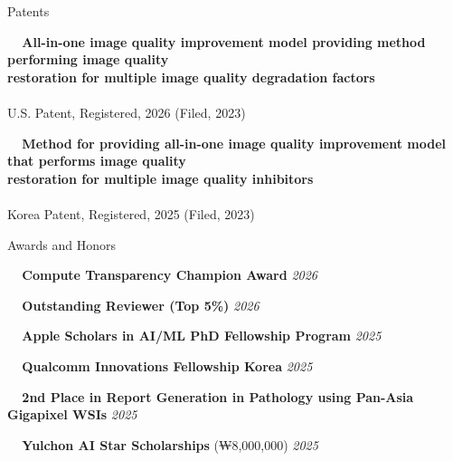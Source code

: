 \documentclass{resume} %
\begin{document}
\begin{rSection}{Patents}

\textbullet~\,\, \textbf{All-in-one image quality improvement model providing method performing image quality \\\hspace*{1.4em}restoration for multiple image quality degradation factors}
\\ 
\\ \hspace*{1.5em}U.S. Patent, Registered, 2026 (Filed, 2023)


\textbullet~\,\, \textbf{Method for providing all-in-one image quality improvement model that performs image quality \\\hspace*{1.4em}restoration for multiple image quality inhibitors}
\\ 
\\ \hspace*{1.5em}Korea Patent, Registered, 2025 (Filed, 2023) \\
\end{rSection}






\begin{rSection}{Awards and Honors}

\textbullet~\,\, {\bf Compute Transparency Champion Award} \hfill {\it 2026}
\\ \hspace*{1.5em}{CVPR 2026 (for ``Erasing Thousands of Concepts'')}

\textbullet~\,\, {\bf Outstanding Reviewer (Top 5\%)} \hfill {\it 2026}
\\ \hspace*{1.5em}{Conference on Computer Vision and Pattern Recognition (CVPR)}

\textbullet~\,\, {\bf Apple Scholars in AI/ML PhD Fellowship Program} \hfill {\it 2025}
\\ \hspace*{1.5em}{Institutional Nominee}

\textbullet~\,\, {\bf Qualcomm Innovations Fellowship Korea} \hfill {\it 2025}
\\ \hspace*{1.5em}{Best paper finalist}

\textbullet~\,\,
{\bf 2nd Place in Report Generation in Pathology using Pan-Asia Gigapixel WSIs} \hfill {\it 2025}
\\ \hspace*{1.5em}{Challenge by International Conference on MICCAI (Served as the team leader, 26 teams participated)}

\textbullet~\,\,
{\bf Yulchon AI Star Scholarships} (₩8,000,000) \hfill {\it 2025}
\\ \hspace*{1.5em}{Youlchon Foundation \& SNU AI Institute} \\

\end{rSection}
\end{document}
